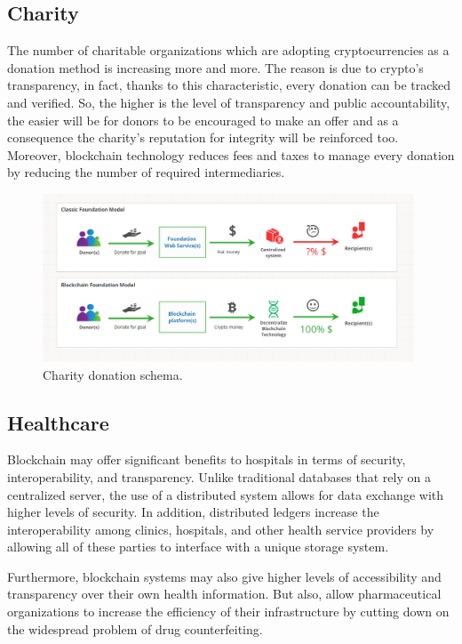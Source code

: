 \subsection{Charity}
\label{sec:charity}

The number of charitable organizations which are adopting cryptocurrencies as a donation
method is increasing more and more. The reason is due to crypto's transparency,
in fact, thanks to this characteristic, every donation can be tracked and verified.
So, the higher is the level of transparency and public accountability, the easier will be for donors  
to be encouraged to make an offer and as a consequence the charity’s 
reputation for integrity will be reinforced too.
Moreover, blockchain technology reduces fees and taxes to manage every donation by
reducing the number of required intermediaries.\cite{binancevision}

\begin{figure}[h]
    \centering
    \includegraphics[height=5cm]{charity.png}
    \caption{Charity donation schema.\cite{cointelegraph}}
    \label{fig:donation}
\end{figure}

\subsection{Healthcare}
\label{sec:healthcare}

Blockchain may offer significant benefits to hospitals in terms of security, 
interoperability, and transparency. Unlike traditional databases that rely on a centralized
server, the use of a distributed system allows for data exchange with higher levels of 
security. In addition, distributed ledgers increase the interoperability among clinics,
hospitals, and other health service providers by allowing all of these parties to interface
with a unique storage system.

Furthermore, blockchain systems may also give higher levels of accessibility and 
transparency over their own health information. But also, allow pharmaceutical 
organizations to increase the efficiency of their infrastructure by cutting 
down on the widespread problem of drug counterfeiting.\cite{binancevision}

